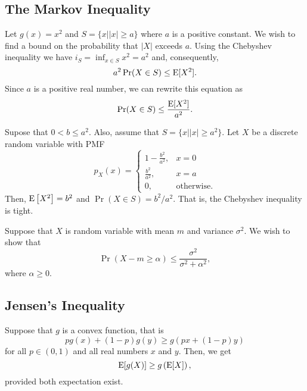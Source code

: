 \subsection{The Markov Inequality}

Let $g(x) = x^2$ and $S = \{ x | |x| \geq a \}$ where $a$ is a positive constant.
We wish to find a bound on the probability that $|X|$ exceeds $a$.
Using the Chebyshev inequality we have $i_S = \inf_{x \in S} x^2 = a^2$ and, consequently,
\begin{equation*}
a^2 \Pr (X \in S) \leq \mathrm{E} [X^2] .
\end{equation*}
Since $a$ is a positive real number, we can rewrite this equation as
\begin{equation*}
\Pr (X \in S) \leq \frac{\mathrm{E} [X^2]}{a^2} .
\end{equation*}

\begin{example}
Supose that $0 < b \leq a^2$.
Also, assume that $S = \{ x | |x| \geq a^2 \}$.
Let $X$ be a discrete random variable with PMF
\begin{equation*}
p_X (x) = \left\{ \begin{array}{ll} 1 - \frac{b^2}{a^2}, & x = 0 \\
\frac{b^2}{a^2}, & x = a \\
0, & \text{otherwise.} \end{array} \right.
\end{equation*}
Then, $\mathrm{E} \left[ X^2 \right] = b^2$ and $\Pr (X \in S) = b^2 / a^2$.
That is, the Chebyshev inequality is tight.
\end{example}

\newpage

\begin{example}
Suppose that $X$ is random variable with mean $m$ and variance $\sigma^2$.
We wish to show that
\begin{equation*}
\Pr ( X - m \geq \alpha ) \leq \frac{\sigma^2}{\sigma^2 + \alpha^2},
\end{equation*}
where $\alpha \geq 0$.
\end{example}


\subsection{Jensen's Inequality}

Suppose that $g$ is a convex function, that is
\begin{equation*}
p g(x) + (1-p) g(y) \geq g(px + (1-p)y)
\end{equation*}
for all $p \in (0,1)$ and all real numbers $x$ and $y$.
Then, we get
\begin{equation*}
\mathrm{E} [g(X)] \geq g \left( \mathrm{E} [X] \right) ,
\end{equation*}
provided both expectation exist.

